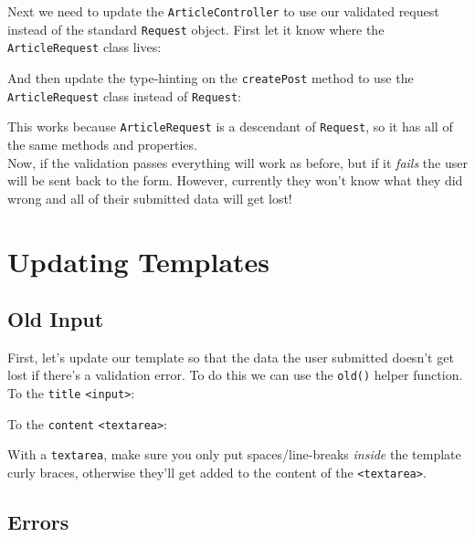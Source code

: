 
Next we need to  update the \texttt{ArticleController} to use our validated request instead of the standard \texttt{Request} object. First let it know where the \texttt{ArticleRequest} class lives:


And then update the type-hinting on the \texttt{createPost} method to use the \texttt{ArticleRequest} class instead of \texttt{Request}:


This works because \texttt{ArticleRequest} is a descendant of \texttt{Request}, so it has all of the same methods and properties.
\\

Now, if the validation passes everything will work as before, but if it \textit{fails} the user will be sent back to the form. However, currently they won't know what they did wrong and all of their submitted data will get lost!


\section{Updating Templates}

\subsection{Old Input}

First, let's update our template so that the data the user submitted doesn't get lost if there's a validation error. To do this we can use the \texttt{old()} helper function.
\\

To the \texttt{title} \texttt{<input>}:


To the \texttt{content} \texttt{<textarea>}:


With a \texttt{textarea}, make sure you only put spaces/line-breaks \textit{inside} the template curly braces, otherwise they'll get added to the content of the \texttt{<textarea>}.


\subsection{Errors}

